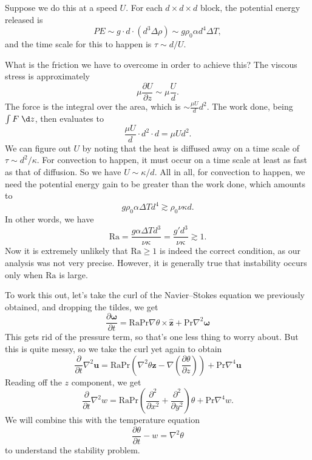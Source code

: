 \documentclass[a4paper]{article}
\newcommand\Ra{\mathrm{Ra}}
\renewcommand\Pr{\mathrm{Pr}}
\begin{document}
\begin{center}
\end{center}

Suppose we do this at a speed $U$. For each $d \times d \times d$ block, the potential energy released is
\[
  PE \sim g \cdot d \cdot (d^3 \Delta \rho) \sim g \rho_0 \alpha d^4 \Delta T,
\]
and the time scale for this to happen is $\tau \sim d/U$.

What is the friction we have to overcome in order to achieve this? The viscous stress is approximately
\[
  \mu \frac{\partial U}{\partial z} \sim \mu \frac{U}{d}.
\]
The force is the integral over the area, which is $\sim \frac{\mu U}{d} d^2$. The work done, being $\int F \;\d z$, then evaluates to
\[
  \frac{\mu U}{d} \cdot d^2 \cdot d = \mu U d^2.
\]
We can figure out $U$ by noting that the heat is diffused away on a time scale of $\tau \sim d^2 / \kappa$. For convection to happen, it must occur on a time scale at least as fast as that of diffusion. So we have $U \sim \kappa/d$. All in all, for convection to happen, we need the potential energy gain to be greater than the work done, which amounts to
\[
  g \rho_0 \alpha \Delta T d^4 \gtrsim \rho_0 \nu \kappa d.
\]
In other words, we have
\[
  \Ra = \frac{g \alpha \Delta T d^3}{\nu \kappa} = \frac{g' d^3}{\nu \kappa} \gtrsim 1.
\]
Now it is extremely unlikely that $\Ra \geq 1$ is indeed the correct condition, as our analysis was not very precise. However, it is generally true that instability occurs only when $\Ra$ is large.

To work this out, let's take the curl of the Navier--Stokes equation we previously obtained, and dropping the tildes, we get
\[
 \frac{\partial \boldsymbol\omega}{\partial t} = \Ra \Pr \nabla \theta \times \hat{\mathbf{z}} + \Pr \nabla^2 \boldsymbol\omega
\]
This gets rid of the pressure term, so that's one less thing to worry about. But this is quite messy, so we take the curl yet again to obtain
\[
 \frac{\partial}{\partial t} \nabla^2 \mathbf{u} = \Ra \Pr \left(\nabla^2 \theta \hat{\mathbf{z}} - \nabla \left(\frac{\partial \theta}{\partial z}\right)\right) + \Pr \nabla^4 \mathbf{u}
\]
Reading off the $z$ component, we get
\[
  \frac{\partial}{\partial t} \nabla^2 w = \Ra \Pr \left(\frac{\partial^2}{\partial x^2} + \frac{\partial^2}{\partial y^2}\right) \theta + \Pr \nabla^4 w.
\]
We will combine this with the temperature equation
\[
  \frac{\partial \theta}{\partial t} - w = \nabla^2 \theta
\]
to understand the stability problem.
\end{document}
